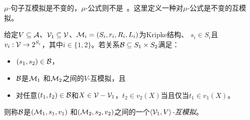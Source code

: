 %	
%	
%	
%	
%		
%	

$\mu$-句子互模拟是不变的，$\mu$-公式则不是~\cite{janin1996expressive}。这里定义一种对$\mu$-公式是不变的互模拟。

\begin{definition}[变元-命题-互模拟]
	给定$V \subseteq {\cal A}$、${\cal V}_1 \subseteq {\cal V}$、${\cal M}_i = (S_i, r_i, R_i, L_i)$为Kripke结构、 $s_i\in S_i$且
	$v_i: {\cal V} \rightarrow 2^{S_i}$，其中$i\in\{1,2\}$。若关系${\cal B}\subseteq S_1 \times S_2$满足：
	\begin{itemize}
		\item $(s_1,s_2)\in{\cal B}$，
		\item ${\cal B}$是${\cal M}_1$ 和${\cal M}_2$之间的$V$-互模拟，且
		\item 对任意$(t_1,t_2)\in {\cal B}$和$X  \in {\cal V}-{\cal V}_1$，$t_2\in v_2(X)$当且仅当$t_1 \in v_1(X)$。
	\end{itemize}	
则称${\cal B}$是$({\cal M}_1,s_1, v_1)$ 和$({\cal M}_2,s_2, v_2)$之间的一个{\em ${\langle{{\cal V}_1, V}\rangle}$-互模拟}。
\end{definition}
%

